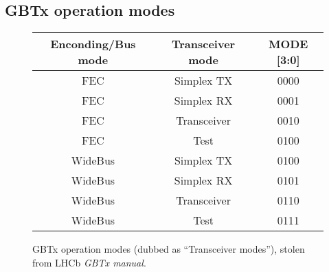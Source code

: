\subsection{GBTx operation modes} \label{appx:4bit}
\begin{figure}[ht]
    \centering
    \begin{tabular}{ccc}
        \toprule
        Enconding/Bus mode & Transceiver mode & MODE [3:0] \\
        \midrule
        FEC & Simplex TX  & 0000 \\
        FEC & Simplex RX  & 0001 \\
        FEC & Transceiver & 0010 \\
        FEC & Test        & 0100 \\
        WideBus & Simplex TX  & 0100 \\
        WideBus & Simplex RX  & 0101 \\
        WideBus & Transceiver & 0110 \\
        WideBus & Test        & 0111 \\
        \bottomrule
    \end{tabular}
    \caption{
        GBTx operation modes (dubbed as ``Transceiver modes''), stolen from
        LHCb \emph{GBTx manual}.
    }
    \label{tab:gbtx-modes}
\end{figure}
